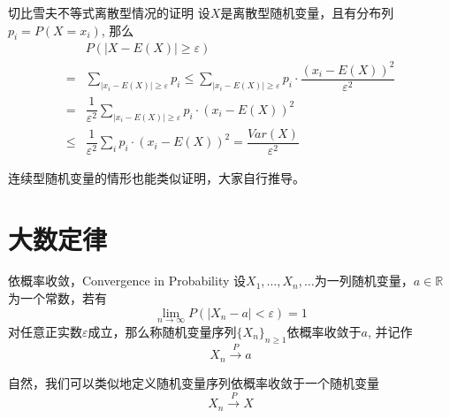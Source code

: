 
\begin{frame}

\begin{block}{切比雪夫不等式离散型情况的证明}
设$X$是离散型随机变量，且有分布列$p_i = P(X = x_i)$, 那么
\begin{align*}
& P(\vert X - E(X) \vert \ge \varepsilon) \\
= & \sum\limits_{\vert x_i - E(X) \vert \ge \varepsilon} p_i \le \sum\limits_{\vert x_i - E(X) \vert \ge \varepsilon} p_i \cdot \dfrac{(x_i - E(X))^2}{\varepsilon^2} \\
= & \dfrac{1}{\varepsilon^2} \sum\limits_{\vert x_i - E(X) \vert \ge \varepsilon} p_i \cdot (x_i - E(X))^2 \\
\le & \dfrac{1}{\varepsilon^2} \sum\limits_i p_i \cdot (x_i - E(X))^2 = \dfrac{Var(X)}{\varepsilon^2}
\end{align*}
\end{block}

\pause

连续型随机变量的情形也能类似证明，大家自行推导。

\end{frame}


\section{大数定律}


\begin{frame}

\begin{block}{依概率收敛，Convergence in Probability}
设$X_1,\ldots,X_n,\ldots$为一列随机变量，$a\in \mathbb{R}$为一个常数，若有
\[\lim\limits_{n\to\infty} P(\vert X_n - a \vert < \varepsilon) = 1\]
对任意正实数$\varepsilon$成立，那么称随机变量序列$\{X_n\}_{n\ge1}$依概率收敛于$a$, 并记作
\[X_n \xrightarrow{P} a\]

\pause

自然，我们可以类似地定义随机变量序列依概率收敛于一个随机变量
\[X_n \xrightarrow{P} X\]
\end{block}

\end{frame}


